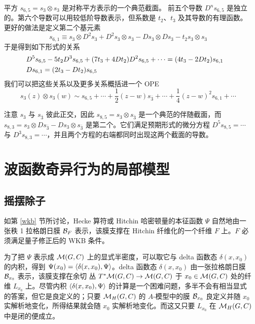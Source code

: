 平方 $s_{6,5} = s_3 \otimes s_3$ 是对称平方表示的一个典范截面。
前五个导数 $D^n s_{6,5}$ 是独立的。第六个导数可以用较低阶导数表示，但系数是 $t_2$、$t_3$ 及其导数的有理函数。
更好的做法是定义第二个基元素
\begin{equation}
s_{6,1} \equiv s_3 \otimes D^2 s_3 + D^2 s_3 \otimes s_3 - D s_3 \otimes Ds_3- t_2 s_3 \otimes s_3
\end{equation} 
于是得到如下形式的关系
\begin{align}
&D^5 s_{6,5}- 5 t_2 D^3 s_{6,5}+ (7 t_3 + 4 D t_2)D^2 s_{6,5} + \cdots = (4 t_3 - 2 D t_2) s_{6,1} \cr
&D s_{6,1} = (2 t_3- D t_2) s_{6,5} 
\end{align} 
我们可以把这些关系以及更多关系概括进一个 OPE
\begin{equation}
s_3(z) \otimes s_3(w) \sim s_{6,5} + \cdots + \frac12 (z-w) s_{\bar 3} +\cdots + \frac14 (z-w)^2 s_{6,1} + \cdots
\end{equation}

注意 $s_3$ 与 $s_{\bar 3}$ 彼此正交，因此 $s_{8,5} = s_3 \otimes s_{\bar 3}$ 是一个典范的伴随截面，而
 $s_{8,3} = s_3 \otimes D s_{\bar 3}-D s_3 \otimes s_{\bar 3}$ 是第二个。它们满足预期形式的微分方程
 $D^5 s_{8,5} = \cdots$ 与 $D^3 s_{8,3}= \cdots$，并且两个方程的右端都同时出现这两个截面的导数。
 
 
 \section{波函数奇异行为的局部模型}\label{localmodel}
 
 \subsection{摇摆除子}\label{wobbly}
 
如第 \ref{wkb} 节所讨论，Hecke 算符或 Hitchin 哈密顿量的本征函数 $\Psi$ 自然地由一张秩 1 拉格朗日膜 ${\mathcal B}_F$ 表示，该膜支撑在 Hitchin 纤维化的一个纤维 $F$ 上。$F$ 必须满足量子修正后的 WKB 条件。
 
为了把 $\Psi$ 表示成 ${\mathcal M}(G,C)$ 上的显式半密度，可以取它与 delta 函数态 $\delta(x,x_0)$ 的内积，得到 $\Psi(x_0)=\langle \delta(x,x_0),\Psi\rangle$。delta 函数态 $\delta(x,x_0)$ 由一张拉格朗日膜 ${\mathcal B}_{x_0}$ 表示，该膜支撑在余切
丛 $T^*{\mathcal M}(G,C)\to {\mathcal M}(G,C)$ 于 $x_0\in {\mathcal M}(G,C)$ 处的纤维 $L_{x_0}$ 上。尽管内积 $\langle \delta(x,x_0),\Psi\rangle$ 的计算是一个困难问题，多半不会有相当显式的答案，但它是良定义的；只要 ${\mathcal M}_H(G,C)$ 的 $A$-模型中的膜 ${\mathcal B}_{x_0}$ 良定义并随 $x_0$ 实解析地变化，所得结果就会随 $x_0$ 实解析地变化。而这又只要
$L_{x_0}$
在 ${\mathcal M}_H(G,C)$ 中是闭的便成立。
 

